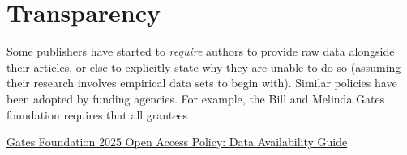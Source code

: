 
\section{Transparency}\fbeg{}\begin{frame}{}


\begin{ftxt}

Some publishers have started to \textsl{require} authors to 
provide raw data alongside their articles, or else 
to explicitly state why they are unable to do 
so (assuming their research involves empirical data 
sets to begin with).  Similar policies have been 
adopted by funding agencies.  For example, the Bill and 
Melinda Gates foundation requires that all grantees 
 \\\vspace*{-23pt}

\href{https://openaccess.gatesfoundation.org/wp-content/uploads/2025/03/Grantee-DAS-Guide.pdf}%
{\textcolor[RGB]{130, 27, 83}{Gates Foundation 2025 Open Access Policy: Data Availability Guide}}%

\end{ftxt}

\end{frame}

